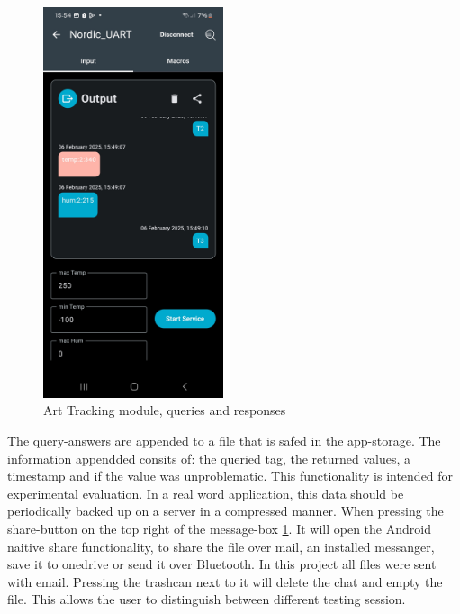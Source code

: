\begin{figure}[ht!]
\centering
\includegraphics[width=200px]{graphics/nRF_toolbox_Bad_Value_2.jpg}
\caption{Art Tracking module, queries and responses}
\label{f:Toolbox_art_filled}
\end{figure}


The query-answers are appended to a file that is safed in the app-storage.
The information appendded consits of: the queried tag, the returned values, a timestamp and if the value was unproblematic.
This functionality is intended for experimental evaluation. 
In a real word application, this data should be periodically backed up on a server in a compressed manner.
When pressing the share-button on the top right of the message-box \ref{f:Toolbox_art_filled}.
It will open the Android naitive share functionality, to share the file over mail, an installed messanger, save it to onedrive or send it over Bluetooth.
In this project all files were sent with email.
Pressing the trashcan next to it will delete the chat and empty the file.
This allows the user to distinguish between different testing session.